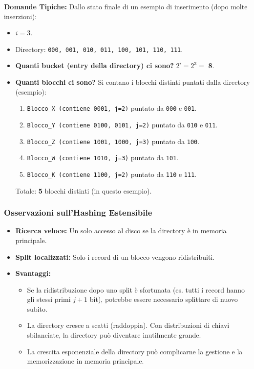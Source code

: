 \textbf{Domande Tipiche:}
Dallo stato finale di un esempio di inserimento (dopo molte inserzioni):
\begin{itemize}
    \item $i = 3$.
    \item Directory: \texttt{000, 001, 010, 011, 100, 101, 110, 111}.
    \item \textbf{Quanti bucket (entry della directory) ci sono?} $2^i = 2^3 =$ \textbf{8}.
    \item \textbf{Quanti blocchi ci sono?} Si contano i blocchi distinti puntati dalla directory (esempio):
    \begin{enumerate}
        \item \texttt{Blocco\_X (contiene 0001, j=2)} puntato da \texttt{000} e \texttt{001}.
        \item \texttt{Blocco\_Y (contiene 0100, 0101, j=2)} puntato da \texttt{010} e \texttt{011}.
        \item \texttt{Blocco\_Z (contiene 1001, 1000, j=3)} puntato da \texttt{100}.
        \item \texttt{Blocco\_W (contiene 1010, j=3)} puntato da \texttt{101}.
        \item \texttt{Blocco\_K (contiene 1100, j=2)} puntato da \texttt{110} e \texttt{111}.
    \end{enumerate}
    Totale: \textbf{5} blocchi distinti (in questo esempio).
\end{itemize}

\subsubsection{Osservazioni sull'Hashing Estensibile}
\begin{itemize}
    \item \textbf{Ricerca veloce:} Un solo accesso al disco se la directory è in memoria principale.
    \item \textbf{Split localizzati:} Solo i record di un blocco vengono ridistribuiti.
    \item \textbf{Svantaggi:}
    \begin{itemize}
        \item Se la ridistribuzione dopo uno split è sfortunata (es. tutti i record hanno gli stessi primi $j+1$ bit), potrebbe essere necessario splittare di nuovo subito.
        \item La directory cresce a scatti (raddoppia). Con distribuzioni di chiavi sbilanciate, la directory può diventare inutilmente grande.
        \item La crescita esponenziale della directory può complicarne la gestione e la memorizzazione in memoria principale.
    \end{itemize}
\end{itemize}

